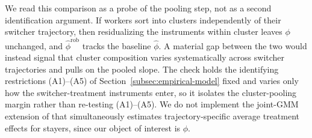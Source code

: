We read this comparison as a probe of the pooling step, not as a second identification argument.
If workers sort into clusters independently of their switcher trajectory, then residualizing the instruments within cluster leaves $\phi$ unchanged, and $\hat\phi^{\mathrm{rob}}$ tracks the baseline $\hat\phi$.
A material gap between the two would instead signal that cluster composition varies systematically across switcher trajectories and pulls on the pooled slope.
The check holds the identifying restrictions (A1)--(A5) of Section~\ref{subsec:empirical-model} fixed and varies only how the switcher-treatment instruments enter, so it isolates the cluster-pooling margin rather than re-testing (A1)--(A5).
We do not implement the joint-GMM extension of \citet{verdierAverageTreatmentEffects2020a} that simultaneously estimates trajectory-specific average treatment effects for stayers, since our object of interest is $\phi$.
